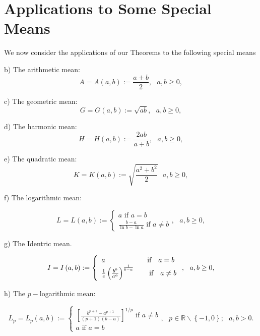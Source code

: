 \documentclass{amsart}
\theoremstyle{plain}
\numberwithin{equation}{section}
\begin{document}
\section{\protect\LARGE Applications to Some Special Means}

We now consider the applications of our Theorems to the following special
means

b) The arithmetic mean:\begin{equation*}
A=A\left( a,b\right) :=\frac{a+b}{2},\text{\ \ }a,b\geq 0,
\end{equation*}

c) The geometric mean: 
\begin{equation*}
G=G\left( a,b\right) :=\sqrt{ab},\text{ \ }a,b\geq 0,
\end{equation*}

d) The harmonic mean:\begin{equation*}
H=H\left( a,b\right) :=\frac{2ab}{a+b},\text{ \ }a,b\geq 0,
\end{equation*}

e) The quadratic mean:\begin{equation*}
K=K\left( a,b\right) :=\sqrt{\frac{a^{2}+b^{2}}{2}}\text{ \ }a,b\geq 0,
\end{equation*}

f) The logarithmic mean:

\begin{equation*}
L=L\left( a,b\right) :=\left\{ 
\begin{array}{l}
a\text{ \ \ \ \ \ \ \ \ \ \ \ \ \ if \ \ }a=b \\ 
\frac{b-a}{\ln b-\ln a}\text{ \ \ \ \ \ if \ \ }a\neq b\end{array}\right. ,\text{ \ }a,b\geq 0,
\end{equation*}

g) The Identric mean.

\begin{equation*}
I=I\left( a,b\right) :=\left\{ 
\begin{array}{l}
a\text{ \ \ \ \ \ \ \ \ \ \ \ \ \ \ \ \ \ if \ \ }a=b \\ 
\frac{1}{e}\left( \frac{b^{b}}{a^{a}}\right) ^{\frac{1}{b-a}}\text{ \ \ \ \
\ if \ \ }a\neq b\end{array}\right. ,\text{ \ }a,b\geq 0,
\end{equation*}

h) The $p-$logarithmic mean:

\begin{equation*}
L_{p}=L_{p}\left( a,b\right) :=\left\{ 
\begin{array}{l}
\left[ \frac{b^{p+1}-a^{p+1}}{\left( p+1\right) \left( b-a\right) }\right]
^{1/p}\text{ \ \ \ \ \ if \ \ }a\neq b \\ 
a\text{ \ \ \ \ \ \ \ \ \ \ \ \ \ \ \ \ \ \ \ \ \ \ \ \ if \ \ }a=b\end{array}\right. ,\text{ \ }p\in 
\mathbb{R}
\backslash \left\{ -1,0\right\} ;\text{ \ }a,b>0.
\end{equation*}
\end{document}
